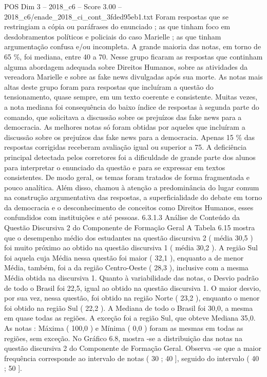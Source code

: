 \begin{textsample}{POS Dim 3 – 2018\_c6 – Score 3.00 – 2018\_c6/enade\_2018\_ci\_cont\_3fded95eb1.txt}
Foram respostas que se restringiam a cópia ou paráfrases do enunciado ; as que tinham foco em desdobramentos políticos e policiais do caso Marielle ; as que tinham argumentação confusa e/ou incompleta.
A grande maioria das notas, em torno de 65 \%, foi mediana, entre 40 a 70.
Nesse grupo ficaram as respostas que continham alguma abordagem adequada sobre Direitos Humanos, sobre as atividades da vereadora Marielle e sobre as fake news divulgadas após sua morte.
As notas mais altas deste grupo foram para respostas que incluíram a questão do tensionamento, quase sempre, em um texto coerente e consistente.
Muitas vezes, a nota mediana foi consequência do baixo índice de respostas à segunda parte do comando, que solicitava a discussão sobre os prejuízos das fake news para a democracia.
As melhores notas só foram obtidas por aqueles que incluíram a discussão sobre os prejuízos das fake news para a democracia.
Apenas 15 \% das respostas corrigidas receberam avaliação igual ou superior a 75.
A deficiência principal detectada pelos corretores foi a dificuldade de grande parte dos alunos para interpretar o enunciado da questão e para se expressar em textos consistentes.
De modo geral, os temas foram tratados de forma fragmentada e pouco analítica.
Além disso, chamou à atenção a predominância do lugar comum na construção argumentativa das respostas, a superficialidade do debate em torno da democracia e o desconhecimento de conceitos como Direitos Humanos, esses confundidos com instituições e até pessoas. 6.3.1.3 Análise de Conteúdo da Questão Discursiva 2 do Componente de Formação Geral A Tabela 6.15 mostra que o desempenho médio dos estudantes na questão discursiva 2 ( média 30,5 ) foi muito próximo ao obtido na questão discursiva 1 ( média 30,2 ).
A região Sul foi aquela cuja Média nessa questão foi maior ( 32,1 ), enquanto a de menor Média, também, foi a da região Centro-Oeste ( 28,3 ), inclusive com a mesma Média obtida na discursiva 1.
Quanto à variabilidade das notas, o Desvio padrão de todo o Brasil foi 22,5, igual ao obtido na questão discursiva 1.
O maior desvio, por sua vez, nessa questão, foi obtido na região Norte ( 23,2 ), enquanto o menor foi obtido na região Sul ( 22,2 ).
A Mediana de todo o Brasil foi 30,0, a mesma em quase todas as regiões.
A exceção foi a região Sul, que obteve Mediana 35,0.
As notas : Máxima ( 100,0 ) e Mínima ( 0,0 ) foram as mesmas em todas as regiões, sem exceção.
No Gráfico 6.8, mostra -se a distribuição das notas na questão discursiva 2 do Componente de Formação Geral.
Observa -se que a maior frequência corresponde ao intervalo de notas ( 30 ; 40 ], seguido do intervalo ( 40 ; 50 ].

\end{textsample}
